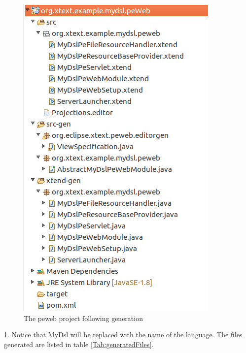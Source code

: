 \documentclass{article}
\begin{document}
\begin{figure}[h!]
  \centering
  \includegraphics[width=0.4\linewidth]{./Screenshots/peWebProjectContentsAfterGeneration.png}
  \caption{The peweb project following generation}
  \label{fig:generatedPeWebProject}
\end{figure} \ref{fig:generatedPeWebProject}. Notice that MyDsl will be replaced with the name of the language.
The files generated are listed in table \ref{Tab:generatedFiles}.
\end{document}
